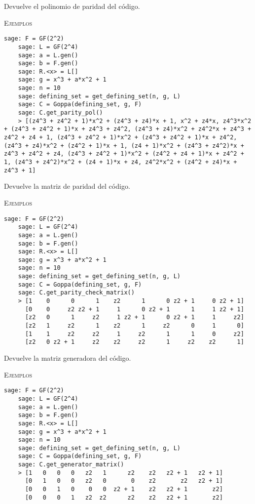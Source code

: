 \begin{description}[leftmargin=1em, font=\normalfont\ttfamily, style=nextline]
\begin{description}[font=\ttfamily, style=nextline]
  \item[get\_parity\_pol(self)] Devuelve el polinomio de paridad del código.

  \textsc{Ejemplos}
  \begin{lstlisting}[gobble=4]
    sage: F = GF(2^2)
    sage: L = GF(2^4)
    sage: a = L.gen()
    sage: b = F.gen()
    sage: R.<x> = L[]
    sage: g = x^3 + a*x^2 + 1
    sage: n = 10
    sage: defining_set = get_defining_set(n, g, L)
    sage: C = Goppa(defining_set, g, F)
    sage: C.get_parity_pol()
    > [(z4^3 + z4^2 + 1)*x^2 + (z4^3 + z4)*x + 1, x^2 + z4*x, z4^3*x^2 + (z4^3 + z4^2 + 1)*x + z4^3 + z4^2, (z4^3 + z4)*x^2 + z4^2*x + z4^3 + z4^2 + z4 + 1, (z4^3 + z4^2 + 1)*x^2 + (z4^3 + z4^2 + 1)*x + z4^2, (z4^3 + z4)*x^2 + (z4^2 + 1)*x + 1, (z4 + 1)*x^2 + (z4^3 + z4^2)*x + z4^3 + z4^2 + z4, (z4^3 + z4^2 + 1)*x^2 + (z4^2 + z4 + 1)*x + z4^2 + 1, (z4^3 + z4^2)*x^2 + (z4 + 1)*x + z4, z4^2*x^2 + (z4^2 + z4)*x + z4^3 + 1]
  \end{lstlisting}

  \item[get\_parity\_check\_matrix(self)] Devuelve la matriz de paridad del código.

  \textsc{Ejemplos}
  \begin{lstlisting}[gobble=4]
    sage: F = GF(2^2)
    sage: L = GF(2^4)
    sage: a = L.gen()
    sage: b = F.gen()
    sage: R.<x> = L[]
    sage: g = x^3 + a*x^2 + 1
    sage: n = 10
    sage: defining_set = get_defining_set(n, g, L)
    sage: C = Goppa(defining_set, g, F)
    sage: C.get_parity_check_matrix()
    > [1    0      0      1    z2      1      0 z2 + 1     0 z2 + 1]
      [0    0     z2 z2 + 1     1      0 z2 + 1      1     1 z2 + 1]
      [z2   0      1     z2     1 z2 + 1      0 z2 + 1     1     z2]
      [z2   1     z2      1    z2      1     z2      0     1      0]
      [1    1     z2     z2     1     z2      1      1     0     z2]
      [z2   0 z2 + 1     z2    z2     z2      1     z2    z2      1]
  \end{lstlisting}

  \item[get\_generator\_matrix(self)] Devuelve la matriz generadora del código.

  \textsc{Ejemplos}
  \begin{lstlisting}[gobble=4]
    sage: F = GF(2^2)
    sage: L = GF(2^4)
    sage: a = L.gen()
    sage: b = F.gen()
    sage: R.<x> = L[]
    sage: g = x^3 + a*x^2 + 1
    sage: n = 10
    sage: defining_set = get_defining_set(n, g, L)
    sage: C = Goppa(defining_set, g, F)
    sage: C.get_generator_matrix()
    > [1   0   0   0   z2   1      z2    z2   z2 + 1   z2 + 1]
      [0   1   0   0   z2   0       0    z2       z2   z2 + 1]
      [0   0   1   0    0   0  z2 + 1    z2   z2 + 1       z2]
      [0   0   0   1   z2  z2      z2    z2   z2 + 1       z2]
  \end{lstlisting}


\end{description}
\end{description}
